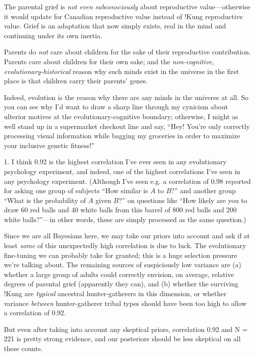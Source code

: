 {\begin{enumerate}
\end{enumerate}

{
 The parental grief is \textit{not even subconsciously} about
reproductive value---otherwise it would update for Canadian
reproductive value instead of !Kung reproductive value. Grief is an
adaptation that now simply exists, real in the mind and continuing
under its own inertia.}

{
 Parents do \textit{not} care about children for the sake of their
reproductive contribution. Parents care about children for their own
sake; and the \textit{non-cognitive, evolutionary-historical} reason
why such minds exist in the universe in the first place is that
children carry their parents' genes.}

{
 Indeed, evolution is the reason why there are any minds in the
universe at all. So you can see why I'd want to draw a
sharp line through my cynicism about ulterior motives at the
evolutionary-cognitive boundary; otherwise, I might as well stand up in
a supermarket checkout line and say, ``Hey!
You're only correctly processing visual information
while bagging my groceries in order to maximize your inclusive genetic
fitness!''}

{
 1. I think 0.92 is the highest correlation I've
ever seen in any evolutionary psychology experiment, and indeed, one of
the highest correlations I've seen in any psychology
experiment. (Although I've seen e.g. a correlation of
0.98 reported for asking one group of subjects ``How
similar is $A$ to $B$?'' and another group
``What is the probability of $A$ given
$B$?'' on questions like ``How likely
are you to draw 60 red balls and 40 white balls from this barrel of 800
red balls and 200 white balls?''---in other words,
these are simply processed as the same question.)}

{
 Since we are all Bayesians here, we may take our priors into
account and ask if at least \textit{some} of this unexpectedly high
correlation is due to luck. The evolutionary fine-tuning we can
probably take for granted; this is a huge selection pressure
we're talking about. The remaining sources of
suspiciously low variance are (a) whether a large group of adults could
correctly envision, on average, relative degrees of parental grief
(apparently they can), and (b) whether the surviving !Kung are
\textit{typical} ancestral hunter-gatherers in this dimension, or
whether variance \textit{between} hunter-gatherer tribal types should
have been too high to allow a correlation of 0.92.}

{
 But even after taking into account any skeptical priors,
correlation 0.92 and N = 221 is pretty strong evidence, and our
posteriors should be less skeptical on all these counts.}

}
